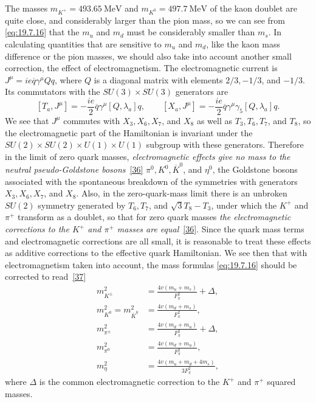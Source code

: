 The masses $m_{K^+}=493.65\ \mathrm{MeV}$ and $m_{K^0}=497.7\ \mathrm{MeV}$ of the kaon doublet are quite close, and considerably larger than the pion mass, so we can see from \eqref{eq:19.7.16} that the $m_u$ and $m_d$ must be considerably smaller than $m_s$. In calculating quantities that are sensitive to $m_u$ and $m_d$, like the kaon mass difference or the pion masses, we should also take into account another small correction, the effect of electromagnetism. The electromagnetic current is $J^\mu=ie\overline q\gamma^\mu Qq$, where $Q$ is a diagonal matrix with elements $2/3,-1/3$, and $-1/3$. Its commutators with the $SU(3)\times SU(3)$ generators are
\[
[T_a,J^\mu]
=-\frac{ie}{2}\overline q\gamma^\mu[Q,\lambda_a]q,
\qquad
[X_a,J^\mu]
=-\frac{ie}{2}\overline q\gamma^\mu\gamma_5[Q,\lambda_a]q.
\]
We see that $J^\mu$ commutes with $X_3,X_6,X_7$, and $X_8$ as well as $T_3,T_6,T_7$, and $T_8$, so the electromagnetic part of the Hamiltonian is invariant under the $SU(2)\times SU(2)\times U(1)\times U(1)$ subgroup with these generators. Therefore in the limit of zero quark masses, \emph{electromagnetic effects give no mass to the neutral pseudo-Goldstone bosons}~\hyperref[ch19-ref-36]{[36]} $\pi^0,K^0,\overline K^0$, and $\eta^0$, the Goldstone bosons associated with the spontaneous breakdown of the symmetries with generators $X_3,X_6,X_7$, and $X_8$. Also, in the zero-quark-mass limit there is an unbroken $SU(2)$ symmetry generated by $T_6,T_7$, and $\sqrt3T_8-T_3$, under which the $K^+$ and $\pi^+$ transform as a doublet, so that for zero quark masses \emph{the electromagnetic corrections to the $K^+$ and $\pi^+$ masses are equal}~\hyperref[ch19-ref-36]{[36]}. Since the quark mass terms and electromagnetic corrections are all small, it is reasonable to treat these effects as additive corrections to the effective quark Hamiltonian. We see then that with electromagnetism taken into account, the mass formulas \eqref{eq:19.7.16} should be corrected to read~\hyperref[ch19-ref-37]{[37]}
\begin{equation}
\begin{aligned}
m_{K^\pm}^2
&=\frac{4v(m_u+m_s)}{F_\pi^2}+\Delta,\\
m_{K^0}^2=m_{\overline K^0}^2
&=\frac{4v(m_d+m_s)}{F_\pi^2},\\
m_{\pi^\pm}^2
&=\frac{4v(m_d+m_u)}{F_\pi^2}+\Delta,\\
m_{\pi^0}^2
&=\frac{4v(m_d+m_u)}{F_\pi^2},\\
m_\eta^2
&=\frac{4v(m_u+m_d+4m_s)}{3F_\pi^2},
\end{aligned}
\tag{19.7.20}\label{eq:19.7.20}
\end{equation}
where $\Delta$ is the common electromagnetic correction to the $K^+$ and $\pi^+$ squared masses.


